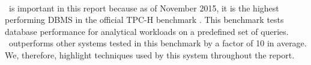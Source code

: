 \paragraph{\exasol}
\label{par:exasol}
\exasol~is important in this report because as of November 2015, it is the highest performing DBMS in the official TPC-H benchmark \cite{noauthor_undated-vr}. This benchmark tests database performance for analytical workloads on a predefined set of queries. \exasol~outperforms other systems tested in this benchmark by a factor of 10 in average. We, therefore, highlight techniques used by this system throughout the report.



